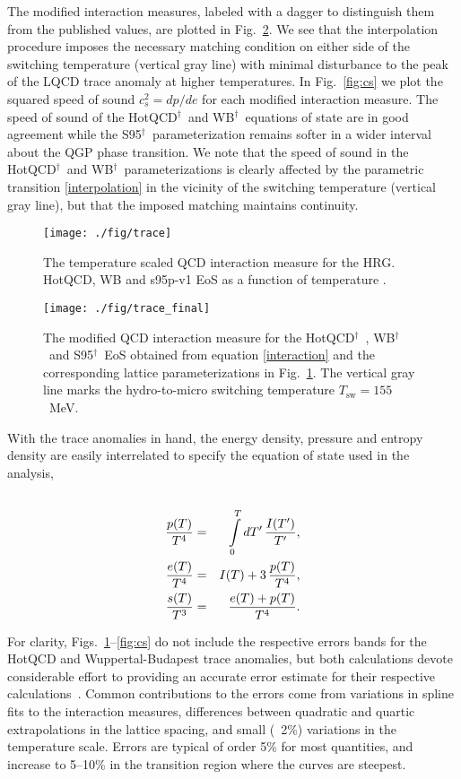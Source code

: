 \documentclass[aps,prc,reprint,amsmath,nofootinbib,superscriptaddress]{revtex4-1}
\newcommand{\hotqcd}{HotQCD$^\dagger$~}
\newcommand{\wb}{WB$^\dagger$~}
\newcommand{\spv}{S95$^\dagger$~}
\begin{document}
The modified interaction measures, labeled with a dagger to distinguish them from the published values, are plotted in Fig.~\ref{fig:trace_final}. 
We see that the interpolation procedure imposes the necessary matching condition on either side of the switching temperature (vertical gray line) with minimal disturbance to the peak of the LQCD trace anomaly at higher temperatures.
In Fig.~\ref{fig:cs} we plot the squared speed of sound $c_s^2 = dp/de$ for each modified interaction measure. The speed of sound of the \hotqcd and \wb equations
of state are in good agreement while the \spv parameterization remains softer in a wider interval about the QGP phase transition. We note that the speed of sound in 
the \hotqcd and \wb parameterizations is clearly affected by the parametric transition \eqref{interpolation} in the vicinity of the switching temperature (vertical gray line), 
but that the imposed matching maintains continuity.

\begin{figure}[t]
  \texttt{[image: ./fig/trace]}
  \caption{\label{fig:trace} The temperature scaled QCD interaction measure for the HRG. HotQCD, WB and s95p-v1 EoS as a function of temperature \cite{Bazavov:2014pvz, Borsanyi:2013bia, Huovinen:2009yb}.}
\end{figure}

\begin{figure}[b]
  \texttt{[image: ./fig/trace\_final]}
  \caption{\label{fig:trace_final} The modified QCD interaction measure for the \hotqcd, \wb and \spv EoS obtained from equation \eqref{interaction} and the corresponding lattice
	  parameterizations in Fig.~\ref{fig:trace}. The vertical gray line marks the hydro-to-micro switching temperature $T_\text{sw} = 155$~MeV.}
\end{figure}

With the trace anomalies in hand, the energy density, pressure and entropy density are easily interrelated to specify the equation of state used in the analysis,
\begin{eqnarray}
 \label{conversion}
 \cr \frac{p(T)}{T^4} &=& \int\limits_0^T dT'\, \frac{I(T')}{T'}, \\
 \frac{e(T)}{T^4} &=& I(T) + 3\, \frac{p(T)}{T^4}, \\
 \frac{s(T)}{T^3} &=& \frac{e(T) + p(T)}{T^4}. 
\end{eqnarray}
 
For clarity, Figs.~\ref{fig:trace}--\ref{fig:cs} do not include the respective errors bands for the HotQCD and Wuppertal-Budapest trace anomalies, but both calculations devote considerable effort
to providing an accurate error estimate for their respective calculations~\cite{Borsanyi:2013bia,Bazavov:2014pvz}.  Common contributions to the errors
come from variations in spline fits to the interaction measures, differences between quadratic and quartic extrapolations in the lattice spacing, and
small (~2\%) variations in the temperature scale.  Errors are typical of order 5\% for most quantities, and increase to 5--10\% in the transition region
where the curves are steepest.
\end{document}
